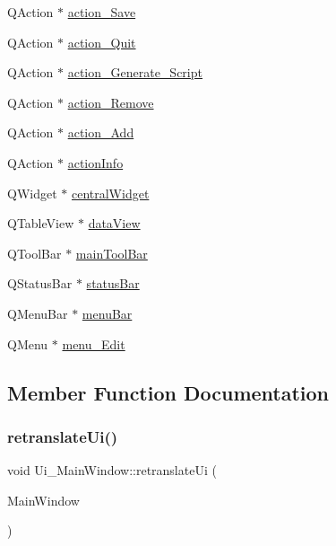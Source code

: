 \begin{DoxyCompactItemize}
Q\+Action $\ast$ \mbox{\hyperlink{class_ui___main_window_a20bbf5ae40051241791821693116aaf4}{action\+\_\+\+Save}}
\item 
Q\+Action $\ast$ \mbox{\hyperlink{class_ui___main_window_a66d85e9dcc5d558d29b8c80b51fc3a1c}{action\+\_\+\+Quit}}
\item 
Q\+Action $\ast$ \mbox{\hyperlink{class_ui___main_window_a04fd31d63ddaacca06d1ace10dafca14}{action\+\_\+\+Generate\+\_\+\+Script}}
\item 
Q\+Action $\ast$ \mbox{\hyperlink{class_ui___main_window_a3e152d258554c99c943b74fbeea8396c}{action\+\_\+\+Remove}}
\item 
Q\+Action $\ast$ \mbox{\hyperlink{class_ui___main_window_a1c3082423ccd1973b4fad43d342b5ecb}{action\+\_\+\+Add}}
\item 
Q\+Action $\ast$ \mbox{\hyperlink{class_ui___main_window_af55fe01495c55c9baf7611571c6b6158}{action\+Info}}
\item 
Q\+Widget $\ast$ \mbox{\hyperlink{class_ui___main_window_a30075506c2116c3ed4ff25e07ae75f81}{central\+Widget}}
\item 
Q\+Table\+View $\ast$ \mbox{\hyperlink{class_ui___main_window_a3cba567e7ad18296d3df4d7845434f88}{data\+View}}
\item 
Q\+Tool\+Bar $\ast$ \mbox{\hyperlink{class_ui___main_window_a5172877001c8c7b4e0f6de50421867d1}{main\+Tool\+Bar}}
\item 
Q\+Status\+Bar $\ast$ \mbox{\hyperlink{class_ui___main_window_a50fa481337604bcc8bf68de18ab16ecd}{status\+Bar}}
\item 
Q\+Menu\+Bar $\ast$ \mbox{\hyperlink{class_ui___main_window_a2be1c24ec9adfca18e1dcc951931457f}{menu\+Bar}}
\item 
Q\+Menu $\ast$ \mbox{\hyperlink{class_ui___main_window_a11f322f3af9857e5138c8024d84d0279}{menu\+\_\+\+Edit}}
\end{DoxyCompactItemize}


\subsection{Member Function Documentation}
\mbox{\label{class_ui___main_window_a097dd160c3534a204904cb374412c618}} 
\subsubsection{\texorpdfstring{retranslateUi()}{retranslateUi()}\hspace{0.1cm}{\footnotesize\ttfamily [1/2]}}
{\footnotesize\ttfamily void Ui\+\_\+\+Main\+Window\+::retranslate\+Ui (\begin{DoxyParamCaption}\item[{Q\+Main\+Window $\ast$}]{Main\+Window }\end{DoxyParamCaption})\hspace{0.3cm}{\ttfamily [inline]}}

